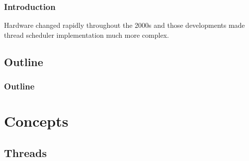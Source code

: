 \documentclass{beamer}
\begin{document}
\begin{frame}
  \frametitle{Introduction}

Hardware changed rapidly throughout the 2000s and those developments made thread scheduler implementation much more complex.

\end{frame}


\subsection*{Outline}

\begin{frame}
  \frametitle{Outline}
  \tableofcontents[hideallsubsections]
\end{frame}

\section[Concepts]{Concepts}

\subsection[Threads]{Threads}
\end{document}
